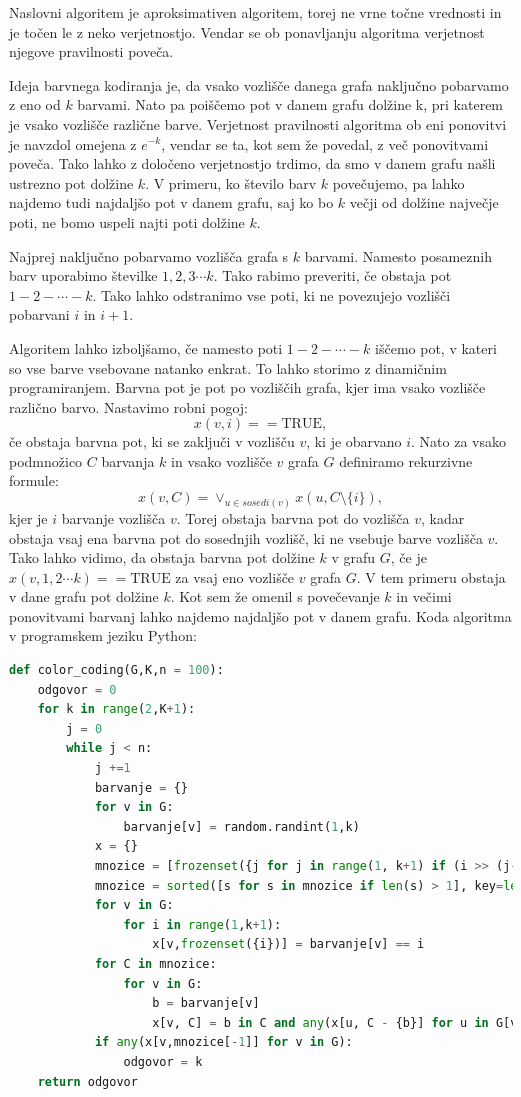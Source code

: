 \documentclass[a4paper, 9pt]{article}
\begin{document}
Naslovni algoritem je aproksimativen algoritem, torej ne vrne točne vrednosti in je točen le z neko verjetnostjo. Vendar se ob ponavljanju algoritma verjetnost njegove pravilnosti poveča.

Ideja barvnega kodiranja je, da vsako vozlišče danega grafa naključno pobarvamo z eno od $k$ barvami. Nato pa poiščemo pot v danem grafu dolžine k, pri katerem je vsako vozlišče različne barve. Verjetnost pravilnosti algoritma ob eni ponovitvi je navzdol omejena z  $e^{-k}$, vendar se ta, kot sem že povedal, z več ponovitvami poveča. Tako lahko z določeno verjetnostjo trdimo, da smo v danem grafu našli ustrezno pot dolžine $k$. V primeru, ko število barv $k$ povečujemo, pa lahko najdemo tudi najdaljšo pot v danem grafu, saj ko bo $k$ večji od dolžine največje poti, ne bomo uspeli najti poti dolžine $k$.

Najprej naključno pobarvamo vozlišča grafa s $k$ barvami. Namesto posameznih barv uporabimo številke $1, 2, 3 \cdots k$. Tako rabimo preveriti, če obstaja pot $1 - 2 - \cdots - k$. Tako lahko odstranimo vse poti, ki ne povezujejo vozlišči pobarvani $i \text{ in } i+1$.

Algoritem lahko izboljšamo, če namesto poti $1 - 2 - \cdots - k$ iščemo pot, v kateri so vse barve vsebovane natanko enkrat. To lahko storimo z dinamičnim programiranjem. Barvna pot je pot po vozliščih grafa, kjer ima vsako vozlišče različno barvo. Nastavimo robni pogoj: $$x(v,i) == \text{TRUE},$$ če obstaja barvna pot, ki se zaključi v vozlišču $v$, ki je obarvano $i$. Nato za vsako podmnožico $C$ barvanja $k$ in vsako vozlišče $v$ grafa $G$ definiramo rekurzivne formule:
$$x(v, C) = \lor _{u \in sosedi(v)} x(u, C \setminus \{ i\} ),$$ kjer je $i$ barvanje vozlišča $v$.
Torej obstaja barvna pot do vozlišča $v$, kadar obstaja vsaj ena barvna pot do sosednjih vozlišč, ki ne vsebuje barve vozlišča $v$. Tako lahko vidimo, da obstaja barvna pot dolžine $k$ v grafu $G$, če je $x(v,{1, 2 \cdots k}) == \text{TRUE}$ za vsaj eno vozlišče $v$ grafa $G$. V tem primeru obstaja v dane grafu pot dolžine $k$. Kot sem že omenil s povečevanje $k$ in večimi ponovitvami barvanj lahko najdemo najdaljšo pot v danem grafu.
Koda algoritma v programskem jeziku Python:
\begin{lstlisting}[language = Python]
    def color_coding(G,K,n = 100): 
    odgovor = 0
    for k in range(2,K+1):
        j = 0
        while j < n:
            j +=1  
            barvanje = {}
            for v in G:
                barvanje[v] = random.randint(1,k)
            x = {}
            mnozice = [frozenset({j for j in range(1, k+1) if (i >> (j-1)) & 1 == 1}) for i in range(2**k)]
            mnozice = sorted([s for s in mnozice if len(s) > 1], key=len)
            for v in G:
                for i in range(1,k+1):
                    x[v,frozenset({i})] = barvanje[v] == i
            for C in mnozice:
                for v in G:
                    b = barvanje[v]
                    x[v, C] = b in C and any(x[u, C - {b}] for u in G[v])
            if any(x[v,mnozice[-1]] for v in G):
                odgovor = k
    return odgovor
\end{lstlisting}
\pagebreak
\end{document}
